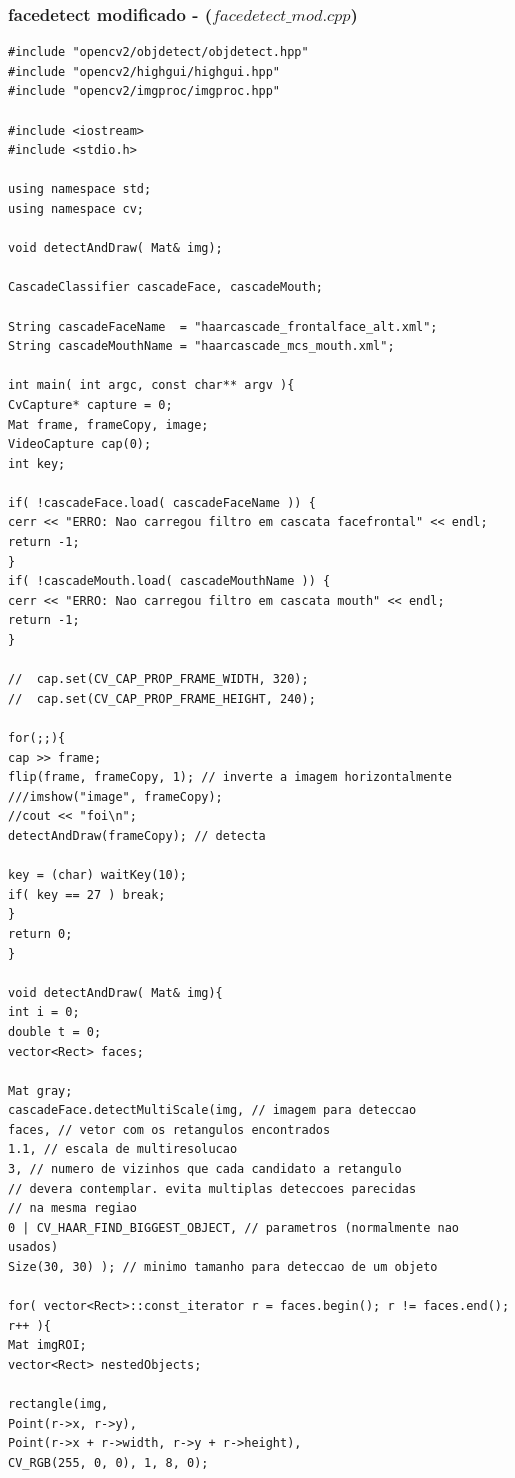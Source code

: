 \documentclass{article}
\begin{document}
	\subsubsection{facedetect modificado - ($facedetect\_mod.cpp$)}
	\begin{lstlisting}
#include "opencv2/objdetect/objdetect.hpp"
#include "opencv2/highgui/highgui.hpp"
#include "opencv2/imgproc/imgproc.hpp"

#include <iostream>
#include <stdio.h>

using namespace std;
using namespace cv;

void detectAndDraw( Mat& img);

CascadeClassifier cascadeFace, cascadeMouth;

String cascadeFaceName  = "haarcascade_frontalface_alt.xml";
String cascadeMouthName = "haarcascade_mcs_mouth.xml";

int main( int argc, const char** argv ){
CvCapture* capture = 0;
Mat frame, frameCopy, image;
VideoCapture cap(0);
int key;

if( !cascadeFace.load( cascadeFaceName )) {
cerr << "ERRO: Nao carregou filtro em cascata facefrontal" << endl;
return -1;
}
if( !cascadeMouth.load( cascadeMouthName )) {
cerr << "ERRO: Nao carregou filtro em cascata mouth" << endl;
return -1;
}

//  cap.set(CV_CAP_PROP_FRAME_WIDTH, 320);
//  cap.set(CV_CAP_PROP_FRAME_HEIGHT, 240);

for(;;){
cap >> frame;
flip(frame, frameCopy, 1); // inverte a imagem horizontalmente
///imshow("image", frameCopy);
//cout << "foi\n";
detectAndDraw(frameCopy); // detecta 

key = (char) waitKey(10);
if( key == 27 ) break;
}  
return 0;
}

void detectAndDraw( Mat& img){
int i = 0;
double t = 0;
vector<Rect> faces;

Mat gray;
cascadeFace.detectMultiScale(img, // imagem para deteccao
faces, // vetor com os retangulos encontrados
1.1, // escala de multiresolucao
3, // numero de vizinhos que cada candidato a retangulo
// devera contemplar. evita multiplas deteccoes parecidas
// na mesma regiao
0 | CV_HAAR_FIND_BIGGEST_OBJECT, // parametros (normalmente nao usados)
Size(30, 30) ); // minimo tamanho para deteccao de um objeto

for( vector<Rect>::const_iterator r = faces.begin(); r != faces.end(); r++ ){
Mat imgROI;
vector<Rect> nestedObjects;

rectangle(img,  
Point(r->x, r->y),  
Point(r->x + r->width, r->y + r->height),  
CV_RGB(255, 0, 0), 1, 8, 0);


\end{lstlisting}
\end{document}
